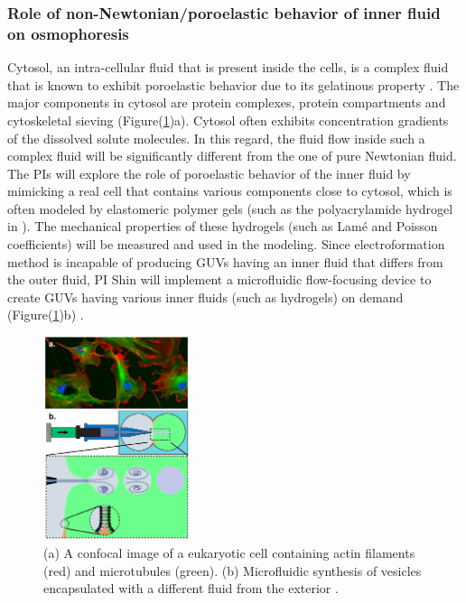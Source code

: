 \documentclass[11pt]{article}
\begin{document}
\subsubsection{Role of non-Newtonian/poroelastic behavior of inner fluid on osmophoresis \label{subsubsec:Role_Non-Newtonian_Behavior}}
Cytosol, an intra-cellular fluid that is present inside the cells, is a complex fluid that is known to exhibit poroelastic behavior due to its gelatinous property \cite{zhou2013,moeendarbary2013}.
 The major components in cytosol are protein complexes, protein compartments 
and cytoskeletal sieving (Figure(\ref{fig:ConfocalImage})a).  Cytosol often exhibits concentration gradients of the dissolved solute molecules.
 In this regard, the fluid flow inside such a complex fluid will be significantly different from the one of pure Newtonian fluid. The PIs will explore the role 
 of poroelastic behavior of the inner fluid by mimicking a real cell that contains various components close to cytosol, which is often modeled by
 elastomeric polymer gels (such as the polyacrylamide hydrogel in \cite{MacMinn2016_PRApplied,Bertrand2016_PRApplied}).  
 The mechanical properties of these hydrogels (such as Lam\'e and Poisson coefficients) will be
 measured and used in the modeling. Since electroformation
  method is incapable of producing GUVs having an inner fluid that differs from the outer fluid, PI Shin will implement a microfluidic flow-focusing 
  device to create GUVs having various inner fluids (such as hydrogels) on demand (Figure(\ref{fig:ConfocalImage})b) \cite{stachowiak2008}. 
\begin{figure}
\vspace*{-7pt}
\centerline{\includegraphics[width=1.7in]{figs/ConfocalImage.pdf}}
\vspace*{-8pt}
\caption{\footnotesize (a) A confocal image of a eukaryotic cell containing actin filaments (red) and microtubules (green). 
(b) Microfluidic synthesis of vesicles encapsulated with a different fluid from the exterior \cite{stachowiak2008}.}
\label{fig:ConfocalImage}
\end{figure}
\end{document}
